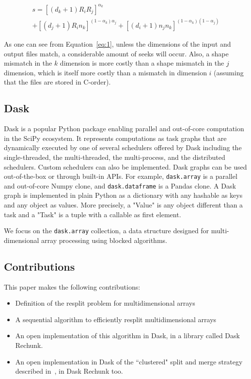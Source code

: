 \documentclass[conference]{IEEEtran}
\begin{document}
\begin{multline} \label{eq:1}
s = [(d_k+1)R_iR_j]^{\alpha_k} \\ + [(d_j+1)R_in_k]^{(1-\alpha_k)\alpha_j} + [(d_i+1)n_jn_k]^{(1-\alpha_k)(1-\alpha_j)}
\end{multline}

As one can see from Equation~\ref{eq:1}, unless the dimensions of the input and
output files match, a considerable amount of seeks will occur. Also, a shape mismatch
in the $k$ dimension is more costly than a shape mismatch in the $j$ dimension,
which is itself more costly than a mismatch in dimension $i$ (assuming that the
files are stored in C-order).

\subsection{Dask}

Dask is a popular Python package enabling parallel and out-of-core
computation in the SciPy ecosystem. It represents computations as task
graphs that are dynamically executed by one of several schedulers offered
by Dask including the single-threaded, the multi-threaded, the
multi-process, and the distributed schedulers. Custom schedulers can also
be implemented. Dask graphs can be used out-of-the-box or through built-in
APIs. For example, \texttt{dask.array} is a parallel and out-of-core Numpy
clone, and
\texttt{dask.dataframe} is a Pandas clone. A Dask graph is implemented in
plain Python as a dictionary with any hashable as keys and any object as
values. More precisely, a "Value" is any object different than a task and a
"Task" is a tuple with a callable as first element.

We focus on the \texttt{dask.array} collection, a data structure designed for
multi-dimensional array processing using blocked algorithms.

\subsection{Contributions}
This paper makes the following contributions:
\begin{itemize}
  \item Definition of the resplit problem for multidimensional arrays
  \item A sequential algorithm to efficiently resplit multidimensional arrays
  \item An open implementation of this algorithm in Dask, in a library called Dask Rechunk.
  \item An open implementation in Dask of the ``clustered" split and merge strategy described in~\cite{seqalgorithms}, in Dask Rechunk too.
\end{itemize}
\end{document}
